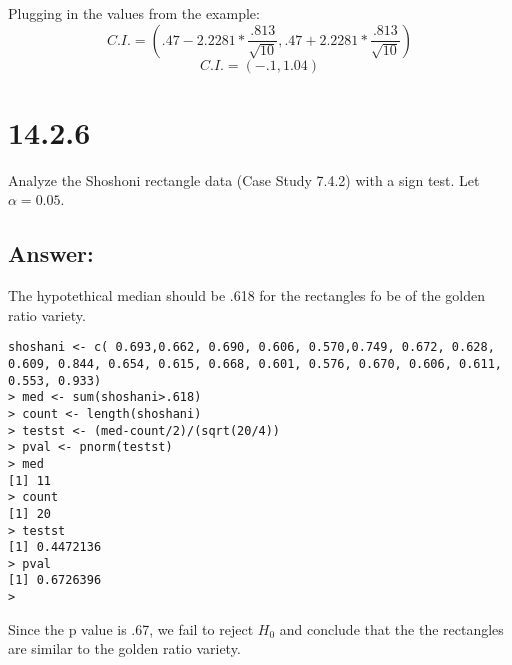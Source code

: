\documentclass[svgnames]{article}
\begin{document}
Plugging in the values from the example:
$$C.I. = (.47 - 2.2281*\frac{.813}{\sqrt{10}},.47 + 2.2281*\frac{.813}{\sqrt{10}})$$
$$C.I. = (-.1,1.04)$$


\section{14.2.6}
Analyze the Shoshoni rectangle data (Case Study 7.4.2) with a sign test. Let $\alpha = 0.05$. 


\subsection*{Answer:}
The hypotethical median should be .618 for the rectangles fo be of the golden ratio variety. 
\begin{lstlisting}
shoshani <- c( 0.693,0.662, 0.690, 0.606, 0.570,0.749, 0.672, 0.628, 0.609, 0.844, 0.654, 0.615, 0.668, 0.601, 0.576, 0.670, 0.606, 0.611, 0.553, 0.933)
> med <- sum(shoshani>.618)
> count <- length(shoshani)
> testst <- (med-count/2)/(sqrt(20/4))
> pval <- pnorm(testst)
> med
[1] 11
> count
[1] 20
> testst
[1] 0.4472136
> pval
[1] 0.6726396
> \end{lstlisting}

Since the p value is .67, we fail to reject $H_0$ and conclude that the the rectangles are similar to the golden ratio variety.
\end{document}
